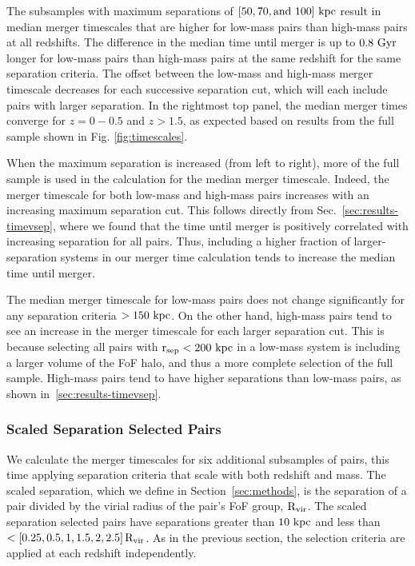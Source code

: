 \documentclass[twocolumn,linenumbers]{aastex631}
\begin{document}
        The subsamples with maximum separations of $[50, 70, \mbox{and } 100]\,\mathrm{\,kpc}$ result in median merger timescales that are higher for low-mass pairs than high-mass pairs at all redshifts. 
        The difference in the median time until merger is up to $0.8\,\mathrm{\,Gyr}$ longer for low-mass pairs than high-mass pairs at the same redshift for the same separation criteria. 
        The offset between the low-mass and high-mass merger timescale decreases for each successive separation cut, which will each include pairs with larger separation. 
        In the rightmost top panel, the median merger times converge for $z=0-0.5$ and $z>1.5$, as expected based on results from the full sample shown in Fig. \ref{fig:timescales}. %
        
        When the maximum separation is increased (from left to right), more of the full sample is used in the calculation for the median merger timescale. 
        Indeed, the merger timescale for both low-mass and high-mass pairs increases with an increasing maximum separation cut.  
        This follows directly from Sec.~\ref{sec:results-timevsep}, where we found that the time until merger is positively correlated with increasing separation for all pairs. 
        Thus, including a higher fraction of larger-separation systems in our merger time calculation tends to increase the median time until merger. 
        
        The median merger timescale for low-mass pairs does not change significantly for any separation criteria $>150\,\mathrm{\,kpc}$. 
        On the other hand, high-mass pairs tend to see an increase in the merger timescale for each larger separation cut. 
        This is because selecting all pairs with $\rm r_{sep}<200\,\mathrm{\,kpc}$ in a low-mass system is including a larger volume of the FoF halo, and thus a more complete selection of the full sample.
        High-mass pairs tend to have higher separations than low-mass pairs, as shown in~\ref{sec:results-timevsep}. 

    \subsubsection{Scaled Separation Selected Pairs}
    \label{sec:results-scal}
        We calculate the merger timescales for six additional subsamples of pairs, this time applying separation criteria that scale with both redshift and mass.
        The scaled separation, which we define in Section~\ref{sec:methods}, is the separation of a pair divided by the virial radius of the pair's FoF group, $\rm R_{vir}$. 
        The scaled separation selected pairs have separations greater than $10\,\mathrm{\,kpc}$ and less than $<[0.25, 0.5, 1, 1.5, 2, 2.5]\,\rm R_{vir}$. 
        As in the previous section, the selection criteria are applied at each redshift independently. 
        
\end{document}
